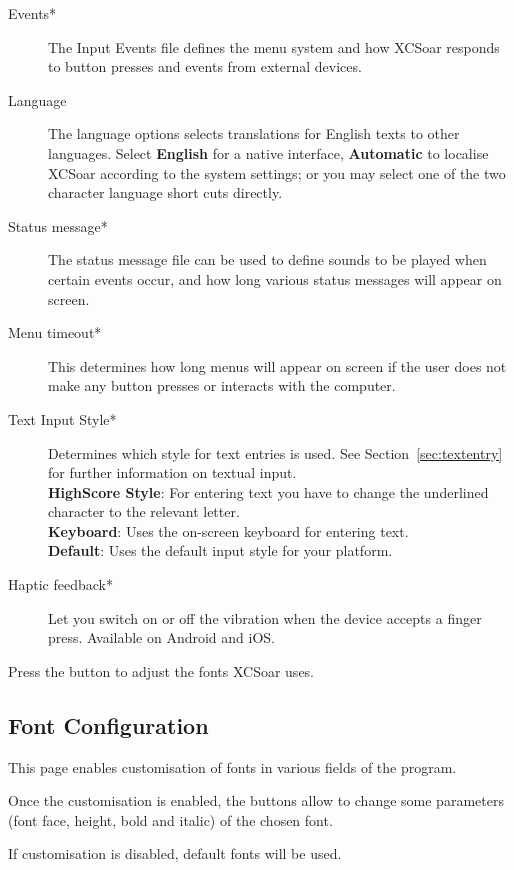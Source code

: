 \begin{description}
\item[Events*]  The Input Events file defines the menu system and how XCSoar
  responds to button presses and events from external devices.
\item[Language]  The language options selects translations for English texts to
  other languages.  Select {\bf English} for a native interface, {\bf Automatic}
  to localise XCSoar according to the system settings; or you may select one of 
  the two character language short cuts directly.
\item[Status message*]  The status message file can be used to define sounds to 
  be played when certain events occur, and how long various status messages will 
  appear on screen.
\item[Menu timeout*]  This determines how long menus will appear on screen if the user
  does not make any button presses or interacts with the computer.
\item[Text Input Style*]  Determines which style for text entries is used. 
  See Section~\ref{sec:textentry} for further information on textual input. \\
  {\bf HighScore Style}: For entering text you have to change the underlined 
  character to the relevant letter. \\
  {\bf Keyboard}: Uses the on-screen keyboard for entering text. \\
  {\bf Default}: Uses the default input style for your platform.
\item[Haptic feedback*]  Let you switch on or off the vibration
  when the device accepts a finger press.  Available on Android
  and iOS.
\end{description}

Press the  button to adjust the fonts XCSoar uses.

\subsection*{Font Configuration}

This page enables customisation of fonts in various fields of the program.


Once the customisation is enabled, the  buttons allow to change 
some parameters (font face, height, bold and italic) of the chosen font.

If customisation is disabled, default fonts will be used.


